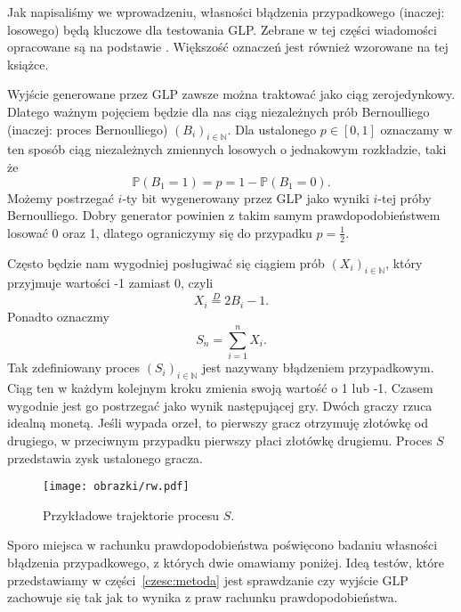 \documentclass[a4paper,11pt,twoside]{book}
\newcommand{\Prob}{\mathbb{P}}
\theoremstyle{definition}
\begin{document}
Jak napisaliśmy we wprowadzeniu, własności błądzenia przypadkowego (inaczej: losowego) będą kluczowe dla testowania GLP. Zebrane w tej części wiadomości opracowane są na podstawie \cite{feller}. Większość oznaczeń jest również wzorowane na tej książce.

Wyjście generowane przez GLP zawsze można traktować jako ciąg zerojedynkowy. Dlatego ważnym pojęciem będzie dla nas ciąg niezależnych prób Bernoulliego (inaczej: proces Bernoulliego) $(B_i)_{i \in \mathbb{N}}$. Dla ustalonego $p \in [0,1]$ oznaczamy w ten sposób ciąg niezależnych zmiennych losowych o jednakowym rozkładzie, taki że
\[ \Prob(B_1 = 1) = p = 1 - \Prob(B_1 = 0). \]
Możemy postrzegać $i$-ty bit wygenerowany przez GLP jako wyniki $i$-tej próby Bernoulliego. Dobry generator powinien z takim samym prawdopodobieństwem losować 0 oraz 1, dlatego ograniczymy się do przypadku $p = \frac{1}{2}$.

Często będzie nam wygodniej posługiwać się ciągiem prób $(X_i)_{i \in \mathbb{N}}$, który przyjmuje wartości -1 zamiast 0, czyli
\[ X_i \stackrel{D}{=} 2 B_i -1. \]
Ponadto oznaczmy
\[ S_n = \sum_{i=1}^{n} X_i. \]
Tak zdefiniowany proces $(S_i)_{i \in \mathbb{N}}$ jest nazywany błądzeniem przypadkowym. Ciąg ten w każdym kolejnym kroku zmienia swoją wartość o 1 lub -1. Czasem wygodnie jest go postrzegać jako wynik następującej gry. Dwóch graczy rzuca idealną monetą. Jeśli wypada orzeł, to pierwszy gracz otrzymuję złotówkę od drugiego, w przeciwnym przypadku pierwszy płaci złotówkę drugiemu. Proces $S$ przedstawia zysk ustalonego gracza.

\begin{figure}[ht]
 \centering
 \texttt{[image: obrazki/rw.pdf]}
 \caption{Przykładowe trajektorie procesu $S$.}
 \label{fig:bladzenie}
\end{figure}

Sporo miejsca w rachunku prawdopodobieństwa poświęcono badaniu własności błądzenia przypadkowego, z których dwie omawiamy poniżej. Ideą testów, które przedstawiamy w części~\ref{czesc:metoda} jest sprawdzanie czy wyjście GLP zachowuje się tak jak to wynika z praw rachunku prawdopodobieństwa.
\end{document}
